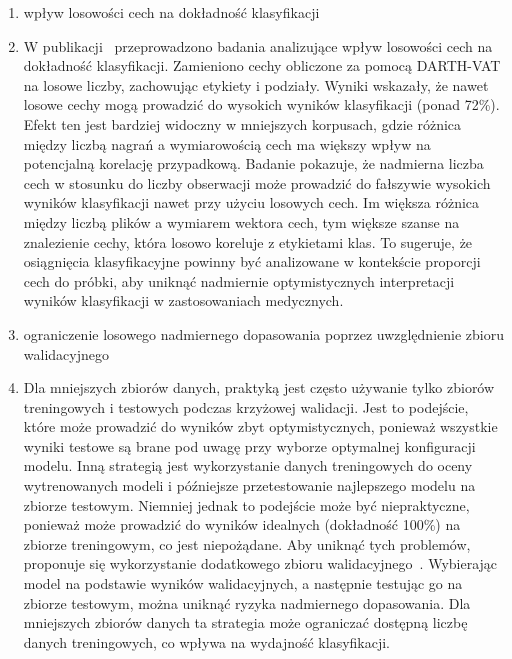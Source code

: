 \begin{enumerate}[label={\alph*)}]
  	\item wpływ losowości cech na dokładność klasyfikacji
	\item[] W publikacji~\cite{SustainedVowelsProblems} przeprowadzono badania analizujące wpływ losowości cech na dokładność klasyfikacji.
Zamieniono cechy obliczone za pomocą DARTH-VAT na losowe liczby, zachowując etykiety i podziały.
Wyniki wskazały, że nawet losowe cechy mogą prowadzić do wysokich wyników klasyfikacji (ponad 72\%).
Efekt ten jest bardziej widoczny w mniejszych korpusach, gdzie różnica między liczbą nagrań a wymiarowością cech ma większy wpływ na potencjalną korelację przypadkową.
Badanie pokazuje, że nadmierna liczba cech w stosunku do liczby obserwacji może prowadzić do fałszywie wysokich wyników klasyfikacji nawet przy użyciu losowych cech.
Im większa różnica między liczbą plików a wymiarem wektora cech, tym większe szanse na znalezienie cechy, która losowo koreluje z etykietami klas.
To sugeruje, że osiągnięcia klasyfikacyjne powinny być analizowane w kontekście proporcji cech do próbki, aby uniknąć nadmiernie optymistycznych interpretacji wyników klasyfikacji w zastosowaniach medycznych.

  	\item ograniczenie losowego nadmiernego dopasowania poprzez uwzględnienie zbioru walidacyjnego
	\item[] Dla mniejszych zbiorów danych, praktyką jest często używanie tylko zbiorów treningowych i testowych podczas krzyżowej walidacji.
Jest to podejście, które może prowadzić do wyników zbyt optymistycznych, ponieważ wszystkie wyniki testowe są brane pod uwagę przy wyborze optymalnej
konfiguracji modelu.
Inną strategią jest wykorzystanie danych treningowych do oceny wytrenowanych modeli i późniejsze przetestowanie najlepszego modelu na zbiorze testowym.
Niemniej jednak to podejście może być niepraktyczne, ponieważ może prowadzić do wyników idealnych (dokładność 100\%) na zbiorze treningowym, co jest niepożądane.
Aby uniknąć tych problemów, proponuje się wykorzystanie dodatkowego zbioru walidacyjnego~\cite{SustainedVowelsProblems}.
Wybierając model na podstawie wyników walidacyjnych, a następnie testując go na zbiorze testowym, można uniknąć ryzyka nadmiernego dopasowania.
Dla mniejszych zbiorów danych ta strategia może ograniczać dostępną liczbę danych treningowych, co wpływa na wydajność klasyfikacji.


\end{enumerate}
